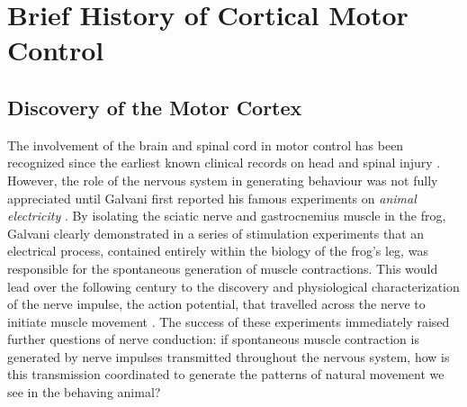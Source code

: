 \section{Brief History of Cortical Motor Control}

\subsection{Discovery of the Motor Cortex}

The involvement of the brain and spinal cord in motor control has been recognized since the earliest known clinical records on head and spinal injury \cite{Louis1994,VanMiddendorp2010}. However, the role of the nervous system in generating behaviour was not fully appreciated until Galvani first reported his famous experiments on \textit{animal electricity} \cite{Galvani1791}. By isolating the sciatic nerve and gastrocnemius muscle in the frog, Galvani clearly demonstrated in a series of stimulation experiments that an electrical process, contained entirely within the biology of the frog's leg, was responsible for the spontaneous generation of muscle contractions. This would lead over the following century to the discovery and physiological characterization of the nerve impulse, the action potential, that travelled across the nerve to initiate muscle movement \cite{DuBois-Reymond1843,Bernstein1868,Schuetze1983}. The success of these experiments immediately raised further questions of nerve conduction: if spontaneous muscle contraction is generated by nerve impulses transmitted throughout the nervous system, how is this transmission coordinated to generate the patterns of natural movement we see in the behaving animal?

